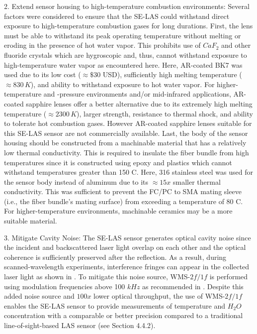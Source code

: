 2. Extend sensor housing to high-temperature combustion environments: Several factors were considered to ensure that the SE-LAS could withstand direct exposure to high-temperature combustion gases for long durations. First, the lens must be able to withstand its peak operating temperature without melting or eroding in the presence of hot water vapor. This prohibits use of $CaF_2$ and other fluoride crystals which are hygroscopic and, thus, cannot withstand exposure to high-temperature water vapor as encountered here. Here, AR-coated BK7 was used due to its low cost ($\approx \$$30 USD), sufficiently high melting temperature ($\approx 830 \,K$), and ability to withstand exposure to hot water vapor. For higher-temperature and -pressure environments and/or mid-infrared applications, AR-coated sapphire lenses offer a better alternative due to its extremely high melting temperature ($\approx 2300\, K$), larger strength, resistance to thermal shock, and ability to tolerate hot combustion gases. However AR-coated sapphire lenses suitable for this SE-LAS sensor are not commercially available. Last, the body of the sensor housing should be constructed from a machinable material that has a relatively low thermal conductivity. This is required to insulate the fiber bundle from high temperatures since it is constructed using epoxy and plastics which cannot withstand temperatures greater than 150 C. Here, 316 stainless steel was used for the sensor body instead of aluminum due to its $\approx 15x$ smaller thermal conductivity. This was sufficient to prevent the FC/PC to SMA mating sleeve (i.e., the fiber bundle’s mating surface) from exceeding a temperature of 80 C. For higher-temperature environments, machinable ceramics may be a more suitable material.

3. Mitigate Cavity Noise: The SE-LAS sensor generates optical cavity noise since the incident and backscattered laser light overlap on each other and the optical coherence is sufficiently preserved after the reflection. As a result, during scanned-wavelength experiments, interference fringes can appear in the collected laser light as shown in \cite{Goldenstein:16}. To mitigate this noise source, WMS-$2f/1f$ is performed using modulation frequencies above 100 $kHz$ as recommended in \cite{Goldenstein:16}. Despite this added noise source and $100x$ lower optical throughput, the use of WMS-$2f/1f$ enables the SE-LAS sensor to provide measurements of temperature and $H_2O$ concentration with a comparable or better precision compared to a traditional line-of-sight-based LAS sensor (see Section 4.4.2).



